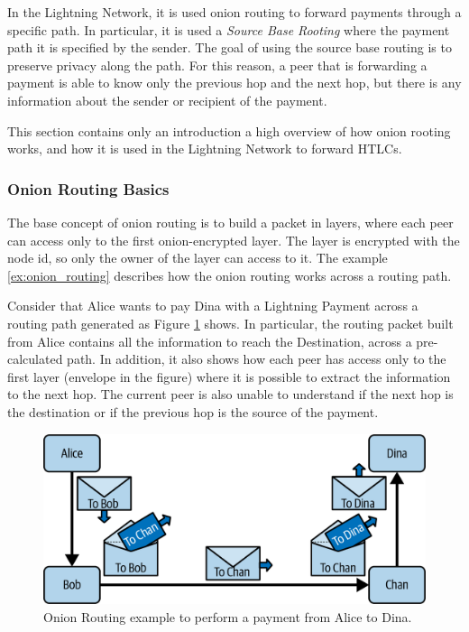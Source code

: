 In the Lightning Network, it is used onion routing to forward payments through a specific path.
In particular, it is used a \emph{Source Base Rooting} where the payment path it is specified by the sender.
The goal of using the source base routing is to preserve privacy along the path. For this reason, a peer that
is forwarding a payment is able to know only the previous hop and the next hop, but there is any information
about the sender or recipient of the payment.

This section contains only an introduction a high overview of how onion rooting works,
and how it is used in the Lightning Network to forward HTLCs.

\subsubsection{Onion Routing Basics}

The base concept of onion routing is to build a packet in layers, where each peer can access only to the
first onion-encrypted layer. The layer is encrypted with the node id, so only the owner of the layer can access to it.
The example \ref{ex:onion_routing} describes how the onion routing works across a routing path.

\begin{example}
  \label{ex:onion_routing}
  Consider that Alice wants to pay Dina with a Lightning Payment across a routing path generated as Figure \ref{fig:routing_path} shows.
  In particular, the routing packet built from Alice contains all the
  information to reach the Destination, across a pre-calculated path.
  In addition, it also shows how each peer has access only to the first layer (envelope in the figure) where it is possible to extract the information to the next hop.
  The current peer is also unable to understand if the next hop is the destination or if the previous hop is the source of the payment.

  \begin{figure}[h]
    \begin{center}
      \includegraphics[width=0.6\columnwidth]{imgs/mtln_1007.png}
    \end{center}
    \caption{Onion Routing example to perform a payment from Alice to Dina.}
    \label{fig:routing_path}
  \end{figure}
\end{example}

